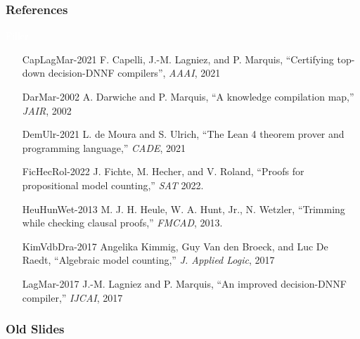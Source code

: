 \documentclass[t,pdf]{beamer}
\begin{document}
\begin{frame}

  \frametitle{References}

\medskip

\begin{minipage}{0.1\textwidth}
    \textcolor{white}{Filler}
\end{minipage}
\begin{minipage}{0.88\textwidth}
\footnotesize
\begin{itemize}

\item[CapLagMar-2021]
  F. Capelli, J.-M. Lagniez, and P. Marquis,
  ``Certifying top-down decision-{DNNF} compilers'',
  {\em AAAI}, 2021

\item[DarMar-2002]
  A. Darwiche and P. Marquis,
  ``A knowledge compilation map,''
  {\em JAIR}, 2002
  
\item[DemUlr-2021]
  L. de Moura and S. Ulrich,
  ``The Lean 4 theorem prover and programming language,''
{\em CADE},  2021

\item[FicHecRol-2022]
  J. Fichte, M. Hecher, and V. Roland,
  ``Proofs for propositional model counting,''
  {\em SAT} 2022.

\item[HeuHunWet-2013] M. J. H. Heule, W. A. Hunt, Jr., N. Wetzler,
  ``Trimming while checking clausal proofs,''
  {\em FMCAD}, 2013.


\item[KimVdbDra-2017] Angelika Kimmig, Guy Van den Broeck, and Luc De Raedt,
  ``Algebraic model counting,''
  {\em J. Applied Logic}, 2017

\item[LagMar-2017] J.-M. Lagniez and  P. Marquis,
  ``An improved decision-DNNF compiler,''
  {\em IJCAI}, 2017
\end{itemize}
\end{minipage}
\end{frame}

\begin{frame}
  \frametitle{Old Slides}
\end{frame}
\end{document}
